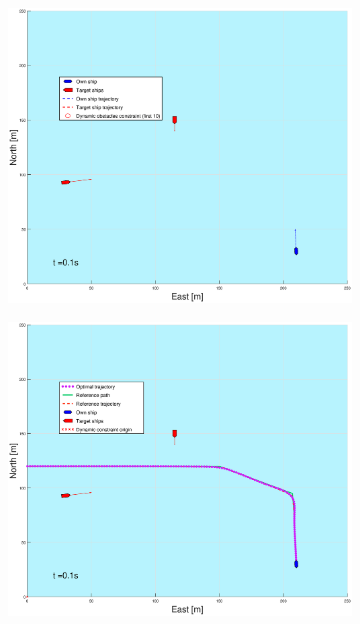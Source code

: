 \begin{figure}[!ht] %
    \begin{subfigure}[b]{0.49\textwidth}
        \centering
        \includegraphics[width=\textwidth]{Images/Figures/Havn1/_Simple_0fig1_time=0}
    \end{subfigure}
    \hfill
    \begin{subfigure}[b]{0.499\textwidth}
        \centering
        \includegraphics[width=\textwidth]{Images/Figures/Havn1/_Simple_0fig999_time=0}

\end{subfigure}
\end{figure}
